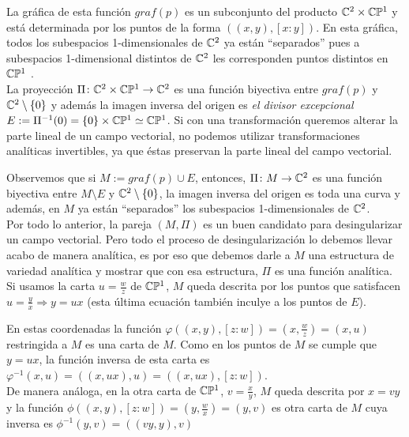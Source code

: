 La gráfica de esta función $graf(p)$ es un subconjunto del producto $\mathbb{C}^{2}\times\mathbb{C}\mathbb{P}^{1}$ y está determinada por los puntos de la forma $((x,y),[x:y])$. En esta gráfica, todos los subespacios 1-dimensionales de $\mathbb{C}^{2}$ ya están ``separados'' pues a subespacios 1-dimensional distintos de $\mathbb{C}^{2}$ les corresponden puntos distintos en $\mathbb{C}\mathbb{P}^{1}$ .\\

La proyección $\Pi\colon\mathbb{C}^{2}\times\mathbb{C}\mathbb{P}^{1}\rightarrow\mathbb{C}^{2}$ es una función biyectiva entre $graf(p)$ y $\mathbb{C}^{2}\setminus\{0\}$ y además la imagen inversa del origen es \emph{el divisor excepcional} $E:=\Pi^{-1}(0)=\{0\}\times\mathbb{C}\mathbb{P}^{1}\simeq\mathbb{C}\mathbb{P}^{1}$. Si con una transformación queremos alterar la parte lineal de un campo vectorial, no podemos utilizar transformaciones analíticas invertibles, ya que éstas preservan la parte lineal del campo vectorial.

Observemos que si $M:=graf(p)\cup E$, entonces, $\Pi\colon M\rightarrow\mathbb{C}^{2}$ es una función biyectiva entre $M\setminus E$ y $\mathbb{C}^{2}\setminus\{0\}$, la imagen inversa del origen es toda una curva y además, en $M$ ya están ``separados'' los subespacios 1-dimensionales de $\mathbb{C}^{2}$.\\

Por todo lo anterior, la pareja $(M,\Pi)$ es un buen candidato para desingularizar un campo vectorial. Pero todo el proceso de desingularización lo debemos llevar acabo de manera analítica, es por eso que debemos darle a $M$ una estructura de variedad analítica y mostrar que con esa estructura, $\Pi$ es una función analítica.\\   

Si usamos la carta $u=\tfrac{w}{z}$ de $\mathbb{C}\mathbb{P}^{1}$, $M$ queda descrita por los puntos que satisfacen $u=\tfrac{y}{x}\Rightarrow y=ux$ (esta última ecuación también inculye a los puntos de $E$).

En estas coordenadas la función $\varphi((x,y),[z:w])=(x,\tfrac{w}{z})=(x,u)$ restringida a $M$ es una carta de $M$. Como en los puntos de $M$ se cumple que $y=ux$, la función inversa de esta carta es $\varphi^{-1}(x,u)=((x,ux),u)=((x,ux),[z:w])$.\\

De manera análoga, en la otra carta de $\mathbb{C}\mathbb{P}^{1}$, $v=\tfrac{x}{y}$, $M$ queda descrita por $x=vy$ y la función $\phi((x,y),[z:w])=(y,\tfrac{w}{x})=(y,v)$ es otra carta de $M$ cuya inversa es $\phi^{-1}(y,v)=((vy,y),v)$\\

